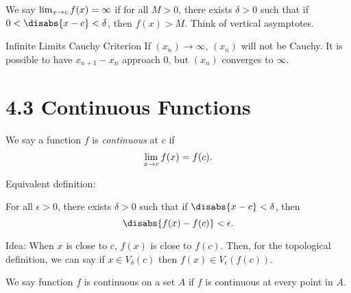 We say \(\lim_{x \rightarrow c}f(x) = \infty\) if for all \(M > 0\), there exists \(\delta > 0\) such that if \(0 < \disabs{x - c} < \delta\), then \(f(x) > M\). Think of vertical asymptotes.


\begin{ntheorem}
    {Infinite Limits Cauchy Criterion} If \((x_n) \rightarrow \infty\), \((x_n)\) will not be Cauchy. It is possible to have \(x_{n+1} - x_n\) approach 0, but \((x_n)\) converges to \(\infty\).
\end{ntheorem}

\section{4.3 Continuous Functions}

\begin{definition}
    We say a function \(f\) is \textit{continuous} at \(c\) if
    \[
        \lim_{x \rightarrow c}f(x) = f(c).
    \]

    Equivalent definition:

    For all \(\epsilon > 0\), there exists \(\delta > 0\) such that if \(\disabs{x - c} < \delta\), then
    \[
        \disabs{f(x) - f(c)} < \epsilon.
    \]
\end{definition}

Idea: When \(x\) is close to \(c\), \(f(x)\) is close to \(f(c)\). Then, for the topological definition, we can say if \(x \in V_\delta(c)\) then \(f(x) \in V_\epsilon(f(c))\).

\begin{definition}
    We say function \(f\) is continuous on a set \(A\) if \(f\) is continuous at every point in \(A\). 
\end{definition}

